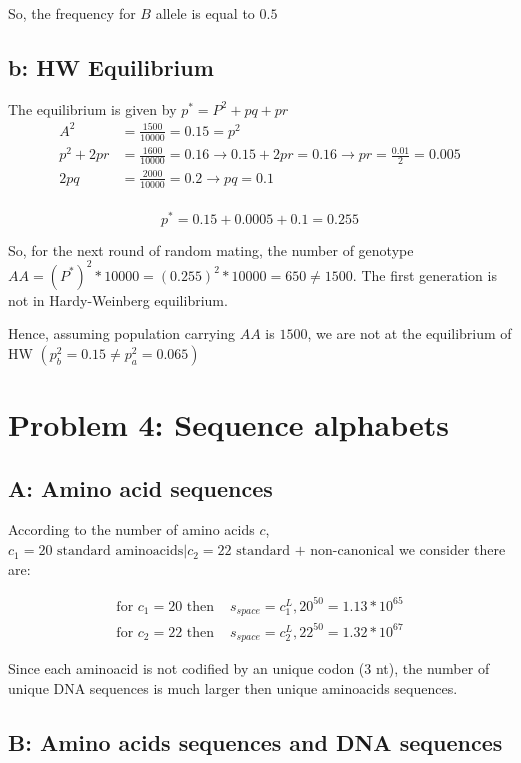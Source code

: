 So, the frequency for $B$ allele is equal to $0.5$

\subsection{b: HW Equilibrium}
The equilibrium is given by $p^* = P^2+pq+pr$
\begin{align}
A^2 &= \frac{1500}{10000} = 0.15 = p^2  \\
p^2+2pr &= \frac{1600}{10000} = 0.16 \rightarrow 0.15+2pr = 0.16 \rightarrow pr = \frac{0.01}{2} = 0.005\\
2pq &= \frac{2000}{10000} = 0.2 \rightarrow pq = 0.1\\
\end{align}

\[ p^* = 0.15+0.0005 + 0.1 = 0.255 \]

So, for the next round of random mating, the number of genotype $AA = (P^*)^2 * 10000 = (0.255)^2*10000 = 650 \neq 1500$.
The first generation is not in Hardy-Weinberg equilibrium.

Hence, assuming population carrying $AA$ is $1500$, we are not at the equilibrium of HW $(p^{2}_b = 0.15 \neq p^{2}_a = 0.065)$

\setcounter{chapter}{4}
\setcounter{section}{0}
\section{Problem 4: Sequence alphabets}

\subsection{A: Amino acid sequences}

According to the number of amino acids $c$, $c_1 = 20 \text{ standard aminoacids} | c_2 = 22 \text{ standard + non-canonical}$ we consider there are:

\begin{align}
\text{for } c_1 = 20 \text{ then } &s_{space} = c_1^L, 20^{50} = 1.13*10^{65}\\
\text{for } c_2 = 22 \text{ then } &s_{space} = c_2^L, 22^{50} = 1.32*10^{67}
\end{align}

Since each aminoacid is not codified by an unique codon (3 nt), the number of unique DNA sequences is much larger then unique aminoacids sequences.


\subsection{B: Amino acids sequences and DNA sequences}

